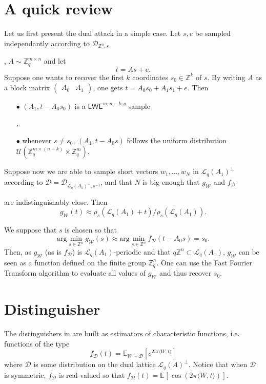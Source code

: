 \documentclass{article}
\newif\ifshowcomments
\DeclareRobustCommand{\TN}[1]{%
  \ifshowcomments
    {\color{orange} [TN][#1]}%
  \fi
}
\newcommand{\ZZ}{\mathbb{Z}}
\newcommand{\EE}{\mathbb{E}}
\newcommand{\argmin}{\text{arg}\min}
\newcommand{\D}{\mathcal{D}}
\newcommand{\LL}{\mathcal{L}}
\newcommand{\U}{\mathcal{U}}
\newcommand{\LWE}{\mathsf{LWE}}
\begin{document}
\section{A quick review}  		%
\label{section : QuickReview}	%

Let us first present the dual attack in a simple case. Let $s,e$ be sampled independantly according to $\D_{\ZZ^n,s}$ \TN{Il y a un conflit de notation pour $s$ ?}, $A\sim \ZZ_q^{m\times n}$ and let 
\[ t = As + e.\]
Suppose one wants to recover the first $k$ coordinates $s_0\in \ZZ^k$ of $s$. By writing $A$ as a block matrix $\begin{pmatrix} A_0 &  A_1\end{pmatrix}$, one gets $t= A_0 s_0 + A_1 s_1 + e$. Then
\begin{itemize}
	\item[$\bullet$] $(A_1, t- A_0 s_0)$ is a $\LWE^{m, n-k, q}$ sample \TN{Dans la définition de $\LWE$ il faudrait fournir la distribution $\nu$ aussi ?},
	\item[$\bullet$] whenever $s\neq s_0$, $(A_1, t- A_0 s)$ follows the uniform distribution $\U(\ZZ_q^{m\times (n-k)}\times \ZZ_q^m)$.
\end{itemize}

Suppose now we are able to sample short vectors $w_1,\ldots , w_N$ in $\LL_q(A_1)^\perp$ according to $\D = \D_{\LL_q(A_1)^\perp , s^{-1}}$, and that $N$ is big enough that $g_{\mathcal{W}}$ and $f_{\D}$ \TN{Pas introduit encore ?} are indistinguishably close. Then 
\[g_{\mathcal{W}}(t) \approx \rho_s(\LL_q(A_1) +t ) / \rho_s(\LL_q(A_1) ).\]

We suppose that $s$ is chosen so that 
\[\argmin_{s\in \ZZ^n}g_{\mathcal{W}}(s) \approx \argmin_{s\in \ZZ^n} f_{\D}(t - A_0 s) = s_0.\] 
Then, as $g_{\mathcal{W}}$ (as is $f_\D$) is $\LL_q(A_1)$-periodic and that $q\ZZ^n\subset \LL_q(A_1)$, $g_{\mathcal{W}}$ can be seen as a function defined on the finite group $\ZZ_q^n$. One can use the Fast Fourier Transform algorithm to evaluate all values of $g_{\mathcal{W}}$ and thus recover $s_0$. \TN{Pour être précis, tu calcules toutes les valeurs de $g_{\mathcal{W}}$ pour ensuite prendre l'argmin ?}

\section{Distinguisher}  		%
\label{section : Distinguisher}	%
\TN{Harmoniser les notations pour $W, \mathcal{W}$.}
The distinguishers in \cite{PoulyShen,DucasPulles} are built as estimators of characteristic functions, i.e. functions of the type
\[f_\D(t) = \EE_{W\sim \D}[e^{2i\pi \langle W, t\rangle}]  \]
where $\D$ is some distribution on the dual lattice $\LL_q(A)^{\perp}$. Notice that when $\D$ is symmetric, $f_\D$  is real-valued so that $f_\D(t) = \EE_{}[\cos(2\pi \langle W ,t\rangle)]$.\\
\end{document}
